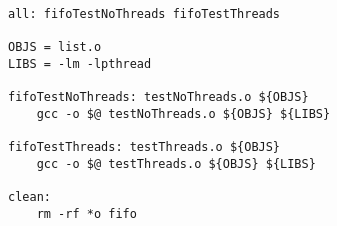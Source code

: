 \begin{lstlisting}
all: fifoTestNoThreads fifoTestThreads

OBJS = list.o
LIBS = -lm -lpthread

fifoTestNoThreads: testNoThreads.o ${OBJS}
	gcc -o $@ testNoThreads.o ${OBJS} ${LIBS}

fifoTestThreads: testThreads.o ${OBJS}
	gcc -o $@ testThreads.o ${OBJS} ${LIBS}

clean:
	rm -rf *o fifo

\end{lstlisting}